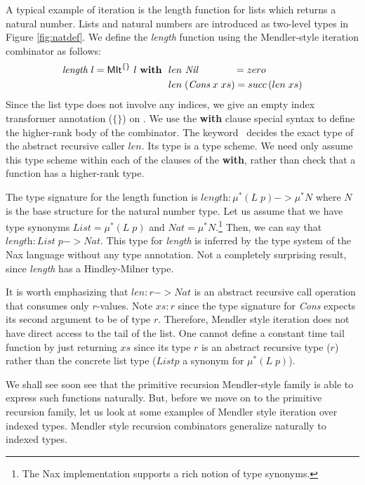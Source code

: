 A typical example of iteration is the length function for lists which
returns a natural number. Lists and natural numbers are introduced as two-level types
in Figure \ref{fig:natdef}. We define the \textit{length} function using the Mendler-style
iteration combinator as follows:
\begin{align*}
\textit{length}~l = \textsf{MIt}^{\{\}}~l~\textbf{with}~~
&  len ~\textit{Nil}~~~~~~~~~~~ = zero \\
&  len \;(\textit{Cons}\;x\;xs) = succ\,(len\;xs)
\end{align*}
Since the list type does not involve any indices, we give an empty index
transformer annotation ($\{\}$) on \MIt. We use the \textbf{with} clause special
syntax to define the higher-rank body of the combinator. The keyword \MIt\ 
decides the exact type of the abstract recursive caller $len$. Its type is
a type scheme. We need only assume this type scheme within each of the clauses
of the \textbf{with}, rather than check that a function has a higher-rank type.

The type signature for the length function is
$\textit{length}:\mu^{*}(L\;p) -> \mu^{*}N$ where $N$ is the
base structure for the natural number type. Let us assume that we have
type synonyms $\textit{List} = \mu^{*}(L\;p)$ and
$\textit{Nat} = \mu^{*}N $.\footnote{The Nax implementation supports
a rich notion of type synonyms.}
Then, we can say that $\textit{length}:\textit{List}\;p -> \textit{Nat}$.
This type for \textit{length} is inferred by the type system of
the Nax language without any type annotation. Not a completely surprising
result, since \textit{length} has a Hindley-Milner type.

It is worth emphasizing that $len : r -> \textit{Nat}$ is
an abstract recursive call operation that consumes only $r$-values.
Note $xs:r$ since the type signature for \textit{Cons} expects
its second argument to be of type $r$. Therefore, Mendler style iteration
does not have direct access to the tail of the list. One cannot define
a constant time tail function by just returning $xs$ since its type $r$ is
an abstract recursive type ($r$) rather than the concrete list type
($List p$ a synonym for $\mu^{*}(L\;p)$). 

We shall see soon see that the primitive recursion Mendler-style
family is able to express such functions naturally.
But, before we move on to the primitive recursion family,
let us look at some examples of Mendler style iteration over indexed types.
Mendler style recursion combinators generalize naturally to indexed types.

